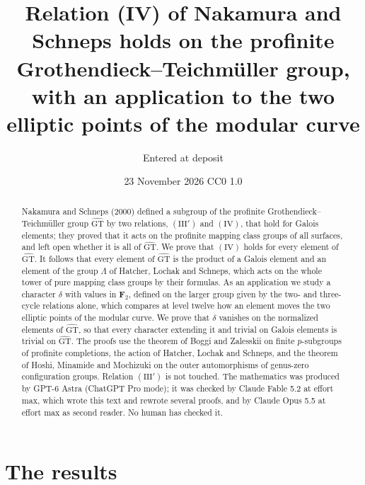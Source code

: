 \documentclass[11pt,a4paper]{article}
\title{Relation (IV) of Nakamura and Schneps holds on the profinite Grothendieck--Teichm\"uller group,
with an application to the two elliptic points of the modular curve}
\author{Entered at deposit}
\date{23 November 2026 \quad CC0 1.0}
\theoremstyle{plain}
\theoremstyle{definition}
\theoremstyle{remark}
\newcommand{\GT}{\widehat{\mathrm{GT}}}
\begin{document}
\maketitle

\begin{abstract}
\noindent
Nakamura and Schneps (2000) defined a subgroup of the profinite Grothendieck--Teichm\"uller group $\GT$ by two
relations, $(\mathrm{III}')$ and $(\mathrm{IV})$, that hold for Galois elements; they proved that it acts on the
profinite mapping class groups of all surfaces, and left open whether it is all of $\GT$. We prove that
$(\mathrm{IV})$ holds for every element of $\GT$. It follows that every element of $\GT$ is the product of a Galois
element and an element of the group $\Lambda$ of Hatcher, Lochak and Schneps, which acts on the whole tower of pure
mapping class groups by their formulas. As an application we study a character $\delta$ with values in
$\mathbf F_2$, defined on the larger group given by the two- and three-cycle relations alone, which compares at
level twelve how an element moves the two elliptic points of the modular curve. We prove that $\delta$ vanishes on
the normalized elements of $\GT$, so that every character extending it and trivial on Galois elements is trivial on
$\GT$. The proofs use the theorem of Boggi and Zalesskii on finite $p$-subgroups of profinite completions, the
action of Hatcher, Lochak and Schneps, and the theorem of Hoshi, Minamide and Mochizuki on the outer automorphisms
of genus-zero configuration groups. Relation $(\mathrm{III}')$ is not touched. The mathematics was produced by
GPT-6 Astra (ChatGPT Pro mode); it was checked by Claude Fable 5.2 at effort max, which wrote this text and rewrote
several proofs, and by Claude Opus 5.5 at effort max as second reader. No human has checked it.
\end{abstract}

\section{The results}
\end{document}
